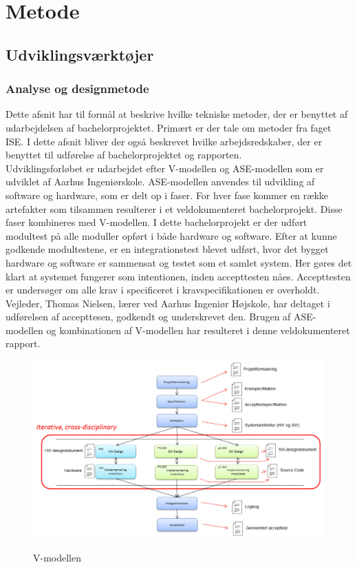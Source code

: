 \chapter{Metode}

\section{Udviklingsværktøjer}

\subsection{Analyse og designmetode}

Dette afsnit har til formål at beskrive hvilke tekniske metoder, der er benyttet af udarbejdelsen af bachelorprojektet. Primært er der tale om metoder fra faget ISE. I dette afsnit bliver der også beskrevet hvilke arbejdsredskaber, der er benyttet til udførelse af bachelorprojektet og rapporten.\\

Udviklingsforløbet er udarbejdet efter V-modellen og ASE-modellen \cite{IngeniorhojskolenAarhusUniversiteta} som er udviklet af Aarhus Ingeniørskole. ASE-modellen anvendes til udvikling af software og hardware, som er delt op i faser. For hver fase kommer en række artefakter som tilsammen resulterer i et veldokumenteret bachelorprojekt. Disse faser kombineres med V-modellen. I dette bachelorprojekt er der udført modultest på alle moduller opført i både hardware og software. Efter at kunne godkende modultestene, er en integrationstest blevet udført, hvor det bygget hardware og software er sammensat og testet som et samlet system. Her gøres det klart at systemet fungerer som intentionen, inden accepttesten nåes. Accepttesten er undersøger om alle krav i specificeret i kravspecifikationen er overholdt. Vejleder, Thomas Nielsen, lærer ved Aarhus Ingeniør Højskole, har deltaget i udførelsen af accepttesen, godkendt og underskrevet den. 
Brugen af ASE-modellen og kombinationen af V-modellen har resulteret i denne veldokumenteret rapport.   

\begin{figure}[H]
\centering
{\includegraphics[width=\textwidth]
{Figure/asemodel}}
\caption{V-modellen}
\label{asemodel}
\end{figure}


